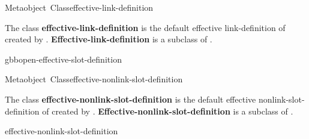 \documentclass[10pt,twoside,english,pdftex]{article}
\begin{document}
\begin{functiondoc}{Metaobject~Class}{effective-link-definition}{}
%

\fnsyntax

\fnpackage {}

\fnmodule {}

\fndescription The class \textbf{effective-link-definition} is the default
effective link-definition  of 
created by \textbf{}.
\textbf{Effective-link-definition} is a subclass of
\textbf{}.

\begin{alsos}{gbbopen-effective-slot-definition}
\end{alsos}

\end{functiondoc}


\begin{functiondoc}{Metaobject~Class}{effective-nonlink-slot-definition}{}
%

\fnsyntax

\fnpackage {}

\fnmodule {}

\fndescription The class \textbf{effective-nonlink-slot-definition} is the
default effective nonlink-slot-definition  of
 created by \textbf{}.
\textbf{Effective-nonlink-slot-definition} is a subclass of
\textbf{}.

\begin{alsos}{effective-nonlink-slot-definition}
\end{alsos}

\end{functiondoc}

\end{document}

